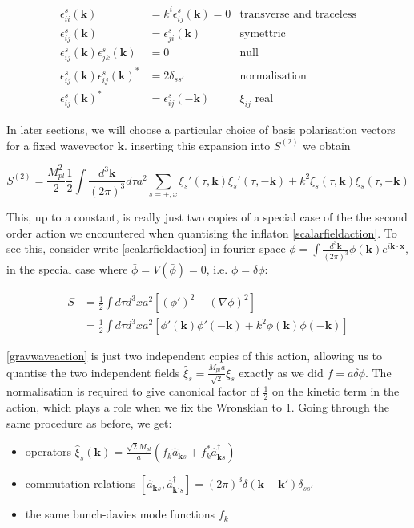 \documentclass[a4paper,10pt]{article}
\renewcommand{\v}[1]{\mathbf{#1}}
\newcommand{\Mp}{M_{pl}}
\newcommand{\half}{\frac{1}{2}}
\newcommand{\bphi}{\bar{\phi}}
\newcommand{\anns}[2]{\hat{a}_{\v{#1}#2}}
\newcommand{\cres}[2]{\hat{a}^\dagger_{\v{#1}#2}}
\newcommand{\fint}[1]{\int \frac{d^3 \v{#1}}{(2\pi)^3}}
\begin{document}
\begin{align}
\epsilon_{ii}^s(\v{k}) &= k^i \epsilon_{ij}^s(\v{k}) = 0 &\text{transverse and traceless}\\
\epsilon_{ij}^s(\v{k}) &= \epsilon_{ji}^s(\v{k}) &\text{symettric}\\
\epsilon_{ij}^s(\v{k})\epsilon_{jk}^s(\v{k}) &= 0&\text{null}\\
\epsilon_{ij}^s(\v{k})\epsilon_{ij}^s(\v{k})^* &= 2\delta_{ss'} &\text{normalisation}\\
\epsilon_{ij}^s(\v{k})^* &= \epsilon_{ij}^s(\v{-k})&\text{$\xi_{ij}$ real}
\end{align}

In later sections, we will choose a particular choice of basis polarisation vectors for a fixed wavevector $\v{k}$. inserting this expansion into $S^{(2)}$ we obtain 

\begin{equation}
S^{(2)} = \frac{\Mp^2}{2} \half \fint{k} d\tau a^2 \sum_{s=+,x} \xi_s'(\tau,\v{k})\xi_s '(\tau,\v{-k})+k^2 \xi_s(\tau,\v{k})\xi_s (\tau,\v{-k})
\label{gravwaveaction}
\end{equation}

This, up to a constant, is really just two copies of a special case of the the second order action we encountered when quantising the inflaton \ref{scalarfieldaction}. To see this, consider write \ref{scalarfieldaction} in fourier space $\phi = \fint{k} \phi(\v{k})e^{i\v{k}\cdot\v{x}}$, in the special case where $\bphi = V(\bphi) = 0$, i.e. $\phi = \delta \phi$:


\begin{equation}\begin{split}
S &= \half \int d\tau d^3x a^2 [(\phi ' )^2 -(\nabla \phi)^2]\\
 &= \half \int d\tau d^3x a^2 [\phi'(\v{k})\phi'(\v{-k}) + k^2 \phi(\v{k})\phi(\v{-k})]
\end{split}\end{equation}

\ref{gravwaveaction} is just two independent copies of this action, allowing us to quantise the two independent fields $\tilde{\xi_s} = \frac{\Mp a}{\sqrt{2}} \xi_s$ exactly as we did $ f = a \delta \phi$. The normalisation is required to give canonical factor of $\half$ on the kinetic term in the action, which plays a role when we fix the Wronskian to 1. Going through the same procedure as before, we get:

\begin{itemize}
\item{operators $\hat{\xi}_s(\v{k}) = \frac{\sqrt{2}\Mp}{a}(f_k\anns{k}{s}+f_k^*\cres{k}{s})$}
\item{commutation relations $[\anns{k}{s},\cres{k'}{s}] = (2\pi)^3\delta(\v{k}-\v{k'})\delta_{ss'}$}
\item{the same bunch-davies mode functions $f_k$}
\end{itemize}
\end{document}
